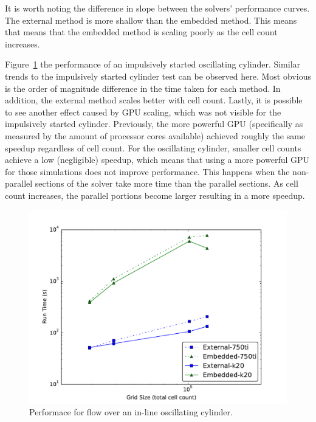 \documentclass[preprint,12pt]{elsarticle}
\begin{document}
It is worth noting the difference in slope between the solvers' performance curves. 
The external method is more shallow than the embedded method. 
This means that means that the embedded method is scaling poorly as the cell count increases. 

Figure~\ref{fig:oscperf} the performance of an impulsively started oscillating cylinder. 
Similar trends to the impulsively started cylinder test can be observed here.
Most obvious is the order of magnitude difference in the time taken for each method. 
In addition, the external method scales better with cell count. 
Lastly, it is possible to see another effect caused by GPU scaling, which was not visible for the impulsively started cylinder. 
Previously, the more powerful GPU (specifically as measured by the amount of processor cores available) achieved roughly the same speedup regardless of cell count. 
For the oscillating cylinder, smaller cell counts achieve a low (negligible) speedup, which means that using a more powerful GPU for those simulations does not improve performance. 
This happens when the non-parallel sections of the solver take more time than the parallel sections. 
As cell count increases, the parallel portions become larger resulting in a more speedup. 
\begin{figure}[!htb]
	\centering
	\par\medskip
	\includegraphics[width=0.6\linewidth]{osc_performance}
	\caption{Performace for flow over an in-line oscillating cylinder.}
	\label{fig:oscperf}
\end{figure}
\end{document}
